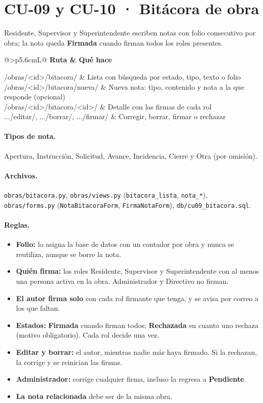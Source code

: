 \documentclass[11pt,letterpaper]{article}
\makeatletter
\newcommand{\cod}[1]{\texttt{\small #1}}
\newcommand{\estatus}[1]{{\sffamily\small\bfseries #1}}
\newcommand{\rutas}[1]{%
\begin{center}\small\rowcolors{2}{grisfondo}{white}
\begin{tabularx}{\linewidth}{@{}>{\ttfamily\footnotesize}p{5.6cm}L@{}}
\toprule\normalfont\sffamily\bfseries Ruta & \sffamily\bfseries Qué hace\\\midrule
#1
\bottomrule\end{tabularx}\end{center}}
\makeatother
\begin{document}
\section{CU-09 y CU-10 · Bitácora de obra}
Residente, Supervisor y Superintendente escriben notas con folio consecutivo por obra; la nota queda \estatus{Firmada} cuando firman todos los roles presentes.

\rutas{
/obras/<id>/bitacora/ & Lista con búsqueda por estado, tipo, texto o folio\\
/obras/<id>/bitacora/nueva/ & Nueva nota: tipo, contenido y nota a la que responde (opcional)\\
/obras/<id>/bitacora/<id>/ & Detalle con las firmas de cada rol\\
.../editar/, .../borrar/, .../firmar/ & Corregir, borrar, firmar o rechazar\\
}

\paragraph{Tipos de nota.} Apertura, Instrucción, Solicitud, Avance, Incidencia, Cierre y Otra (por omisión).

\paragraph{Archivos.} \cod{obras/bitacora.py}, \cod{obras/views.py} (\cod{bitacora\_lista}, \cod{nota\_*}), \cod{obras/forms.py} (\cod{NotaBitacoraForm}, \cod{FirmaNotaForm}), \cod{db/cu09\_bitacora.sql}.

\paragraph{Reglas.}
\begin{itemize}
  \item \textbf{Folio:} lo asigna la base de datos con un contador por obra y nunca se reutiliza, aunque se borre la nota.
  \item \textbf{Quién firma:} los roles Residente, Supervisor y Superintendente con al menos una persona activa en la obra. Administrador y Directivo no firman.
  \item \textbf{El autor firma solo} con cada rol firmante que tenga, y se avisa por correo a los que faltan.
  \item \textbf{Estados:} \estatus{Firmada} cuando firman todos; \estatus{Rechazada} en cuanto uno rechaza (motivo obligatorio). Cada rol decide una vez.
  \item \textbf{Editar y borrar:} el autor, mientras nadie más haya firmado. Si la rechazan, la corrige y se reinician las firmas.
  \item \textbf{Administrador:} corrige cualquier firma, incluso la regresa a \estatus{Pendiente}.
  \item \textbf{La nota relacionada} debe ser de la misma obra.
\end{itemize}
\end{document}
